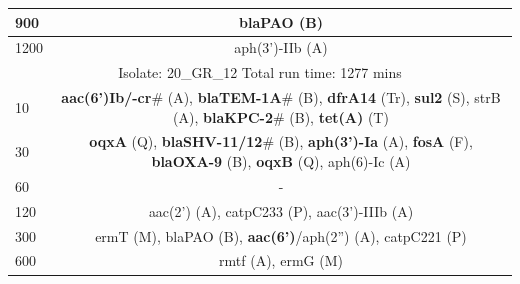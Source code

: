 \begin{table}[!hpt]
\begin{tabular}{|l|c|}
900         & blaPAO (B)                                                                                                                                                                                                                           \\ \hline
1200        & aph(3’)-IIb (A)                                                                                                                                                                                                                      \\ \hline \hline
\multicolumn{2}{|c|}{\small Isolate: 20\_GR\_12 Total run time: 1277 mins}                                                                                                                                                                                                            \\ \hline \hline
10          & \textbf{aac(6’)Ib/-cr}\# (A), \textbf{blaTEM-1A}\# (B), \textbf{dfrA14} (Tr), \textbf{sul2} (S), strB (A), \textbf{blaKPC-2}\# (B),\textbf{ tet(A)} (T)                                                                                                                                    \\ \hline
30          & \textbf{oqxA} (Q), \textbf{blaSHV-11/12}\# (B), \textbf{aph(3’)-Ia} (A), \textbf{fosA} (F), \textbf{blaOXA-9} (B), \textbf{oqxB} (Q), aph(6)-Ic (A)                                                                                                                                        \\ \hline
60          & -                                                                                                                                                                                                                                    \\ \hline
120         & aac(2’) (A), catpC233 (P), aac(3’)-IIIb (A)                                                                                                                                                                                          \\ \hline
300         & ermT (M), blaPAO (B),\textbf{ aac(6’)}/aph(2”) (A), catpC221 (P)                                                                                                                                                                              \\ \hline
600         & rmtf (A), ermG (M)                                                                                                                                                                                                                   \\ \hline

\end{tabular}
\end{table}
